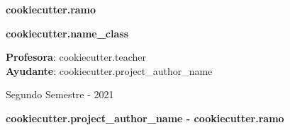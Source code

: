 \documentclass[10pt]{article}
\begin{document}
\begin{center}

  \large{\textbf{ {{ cookiecutter.ramo }} }}

  \Large{\noindent \textbf{ {{ cookiecutter.name_class }} }}

  \large{ \noindent \textbf{Profesora}: {{ cookiecutter.teacher }} }\\

  \normalsize{\textbf{Ayudante}: {{ cookiecutter.project_author_name }} }

  \bigskip
  \textmd{\large{Segundo Semestre - 2021}}

  \bigskip

  \normalsize{\textbf{ {{ cookiecutter.project_author_name }} - {{ cookiecutter.ramo }} }}

\end{center}

\end{document}
